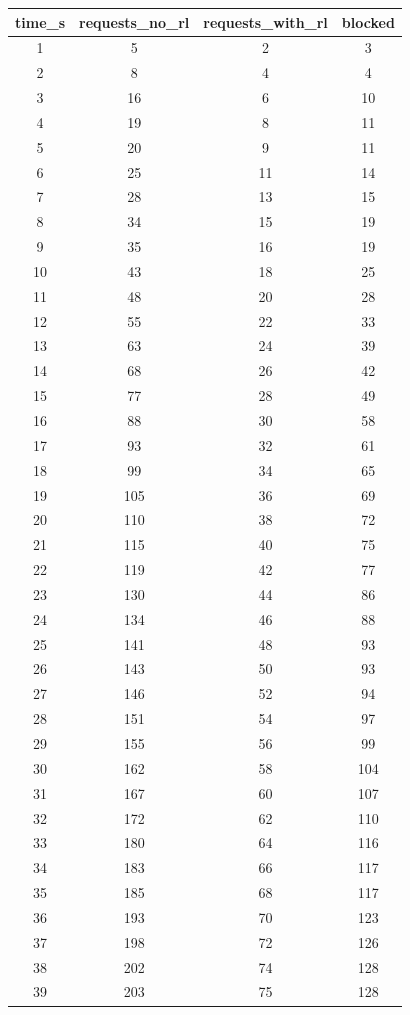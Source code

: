 \begin{table}[h]
\centering
\begin{tabular}{|c|c|c|c|}
\hline
time_s & requests_no_rl & requests_with_rl & blocked \\ \hline
1 & 5 & 2 & 3 \\
2 & 8 & 4 & 4 \\
3 & 16 & 6 & 10 \\
4 & 19 & 8 & 11 \\
5 & 20 & 9 & 11 \\
6 & 25 & 11 & 14 \\
7 & 28 & 13 & 15 \\
8 & 34 & 15 & 19 \\
9 & 35 & 16 & 19 \\
10 & 43 & 18 & 25 \\
11 & 48 & 20 & 28 \\
12 & 55 & 22 & 33 \\
13 & 63 & 24 & 39 \\
14 & 68 & 26 & 42 \\
15 & 77 & 28 & 49 \\
16 & 88 & 30 & 58 \\
17 & 93 & 32 & 61 \\
18 & 99 & 34 & 65 \\
19 & 105 & 36 & 69 \\
20 & 110 & 38 & 72 \\
21 & 115 & 40 & 75 \\
22 & 119 & 42 & 77 \\
23 & 130 & 44 & 86 \\
24 & 134 & 46 & 88 \\
25 & 141 & 48 & 93 \\
26 & 143 & 50 & 93 \\
27 & 146 & 52 & 94 \\
28 & 151 & 54 & 97 \\
29 & 155 & 56 & 99 \\
30 & 162 & 58 & 104 \\
31 & 167 & 60 & 107 \\
32 & 172 & 62 & 110 \\
33 & 180 & 64 & 116 \\
34 & 183 & 66 & 117 \\
35 & 185 & 68 & 117 \\
36 & 193 & 70 & 123 \\
37 & 198 & 72 & 126 \\
38 & 202 & 74 & 128 \\
39 & 203 & 75 & 128 \\

\end{tabular}
\end{table}
